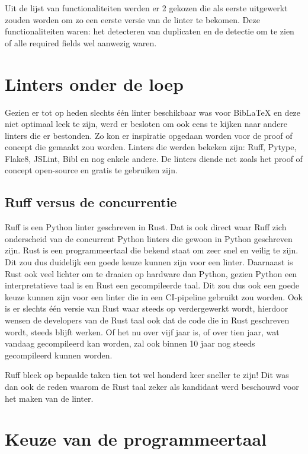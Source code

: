 Uit de lijst van functionaliteiten werden er 2 gekozen die als eerste uitgewerkt zouden worden om zo een eerste versie van de linter te bekomen. Deze functionaliteiten waren: het detecteren van duplicaten en de detectie om te zien of alle required fields wel aanwezig waren.

\section{Linters onder de loep}
\label{sec:linters-onder-de-loep}

Gezien er tot op heden slechts één linter beschikbaar was voor BibLaTeX en deze niet optimaal leek te zijn, werd er besloten om ook eens te kijken naar andere linters die er bestonden. Zo kon er inspiratie opgedaan worden voor de proof of concept die gemaakt zou worden. Linters die werden bekeken zijn: Ruff, Pytype, Flake8, JSLint, Bibl en nog enkele andere. De linters diende net zoals het proof of concept open-source en gratis te gebruiken zijn.

\subsection{Ruff versus de concurrentie}
\label{subsec:ruff}
Ruff is een Python linter geschreven in Rust. Dat is ook direct waar Ruff zich onderscheid van de concurrent Python linters die gewoon in Python geschreven zijn. Rust is een programmeertaal die bekend staat om zeer snel en veilig te zijn. Dit zou dus duidelijk een goede keuze kunnen zijn voor een linter. Daarnaast is Rust ook veel lichter om te draaien op hardware dan Python, gezien Python een interpretatieve taal is en Rust een gecompileerde taal. Dit zou dus ook een goede keuze kunnen zijn voor een linter die in een CI-pipeline gebruikt zou worden. Ook is er slechts één versie van Rust waar steeds op verdergewerkt wordt, hierdoor wensen de developers van de Rust taal ook dat de code die in Rust geschreven wordt, steeds blijft werken. Of het nu over vijf jaar is, of over tien jaar, wat vandaag gecompileerd kan worden, zal ook binnen 10 jaar nog steeds gecompileerd kunnen worden. 

Ruff bleek op bepaalde taken tien tot wel honderd keer sneller te zijn! Dit was dan ook de reden waarom de Rust taal zeker als kandidaat werd beschouwd voor het maken van de linter.

\section{Keuze van de programmeertaal}
